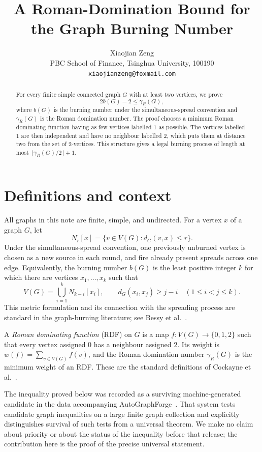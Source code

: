 \documentclass[11pt]{article}
\title{A Roman-Domination Bound for the Graph Burning Number}
\author{Xiaojian Zeng\\
PBC School of Finance, Tsinghua University, 100190\\
\texttt{xiaojianzeng@foxmail.com}}
\date{}
\begin{document}
\maketitle

\begin{abstract}
For every finite simple connected graph $G$ with at least two vertices, we
prove
\[
  2b(G)-2\leq \gamma_R(G),
\]
where $b(G)$ is the burning number under the simultaneous-spread convention
and $\gamma_R(G)$ is the Roman domination number.  The proof chooses a
minimum Roman dominating function having as few vertices labelled $1$ as
possible.  The vertices labelled $1$ are then independent and have no
neighbour labelled $2$, which puts them at distance two from the set of
$2$-vertices.  This structure gives a legal burning process of length at most
$\lfloor\gamma_R(G)/2\rfloor+1$.
\end{abstract}

\section{Definitions and context}

All graphs in this note are finite, simple, and undirected.  For a vertex $x$
of a graph $G$, let
\[
  N_r[x]=\{v\in V(G):d_G(v,x)\leq r\}.
\]
Under the simultaneous-spread convention, one previously unburned vertex is
chosen as a new source in each round, and fire already present spreads across
one edge.  Equivalently, the burning number $b(G)$ is the least positive
integer $k$ for which there are vertices $x_1,\ldots,x_k$ such that
\begin{equation}\label{eq:burning}
 V(G)=\bigcup_{i=1}^k N_{k-i}[x_i],
 \qquad d_G(x_i,x_j)\geq j-i\quad(1\leq i<j\leq k).
\end{equation}
This metric formulation and its connection with the spreading process are
standard in the graph-burning literature; see Bessy et
al.~\cite{BessyEtAl2018}.

A \emph{Roman dominating function} (RDF) on $G$ is a map
$f:V(G)\to\{0,1,2\}$ such that every vertex assigned $0$ has a neighbour
assigned $2$.  Its weight is $w(f)=\sum_{v\in V(G)}f(v)$, and the Roman
domination number $\gamma_R(G)$ is the minimum weight of an RDF.  These are
the standard definitions of Cockayne et al.~\cite{CockayneEtAl2004}.

The inequality proved below was recorded as a surviving machine-generated
candidate in the data accompanying AutoGraphForge~\cite{Pastorek2026}.
That system tests candidate graph inequalities on a large finite graph
collection and explicitly distinguishes survival of such tests from a
universal theorem.  We make no claim about priority or about the status of the
inequality before that release; the contribution here is the proof of the
precise universal statement.
\end{document}

